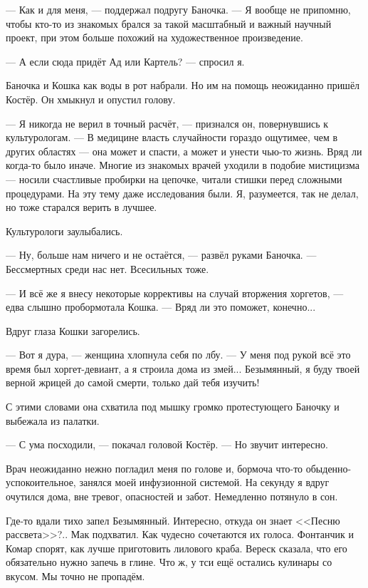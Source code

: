 --- Как и для меня, --- поддержал подругу Баночка.
--- Я вообще не припомню, чтобы кто-то из знакомых брался за такой масштабный и важный научный проект, при этом больше похожий на художественное произведение.

--- А если сюда придёт Ад или Картель? --- спросил я.

Баночка и Кошка как воды в рот набрали.
Но им на помощь неожиданно пришёл Костёр.
Он хмыкнул и опустил голову.

--- Я никогда не верил в точный расчёт, --- признался он, повернувшись к культурологам.
--- В медицине власть случайности гораздо ощутимее, чем в других областях --- она может и спасти, а может и унести чью-то жизнь.
Вряд ли когда-то было иначе.
Многие из знакомых врачей уходили в подобие мистицизма --- носили счастливые пробирки на цепочке, читали стишки перед сложными процедурами.
На эту тему даже исследования были.
Я, разумеется, так не делал, но тоже старался верить в лучшее.

Культурологи заулыбались.

--- Ну, больше нам ничего и не остаётся, --- развёл руками Баночка.
--- Бессмертных среди нас нет.
Всесильных тоже.

--- И всё же я внесу некоторые коррективы на случай вторжения хоргетов, --- едва слышно пробормотала Кошка.
--- Вряд ли это поможет, конечно...

Вдруг глаза Кошки загорелись.

--- Вот я дура, --- женщина хлопнула себя по лбу.
--- У меня под рукой всё это время был хоргет-девиант, а я строила дома из змей\FM...
Безымянный, я буду твоей верной жрицей до самой смерти, только дай тебя изучить!

С этими словами она схватила под мышку громко протестующего Баночку и выбежала из палатки.

--- С ума посходили, --- покачал головой Костёр.
--- Но звучит интересно.

Врач неожиданно нежно погладил меня по голове и, бормоча что-то обыденно-успокоительное, занялся моей инфузионной системой.
На секунду я вдруг очутился дома, вне тревог, опасностей и забот.
Немедленно потянуло в сон.

Где-то вдали тихо запел Безымянный.
Интересно, откуда он знает <<Песню рассвета>>?..
Мак подхватил.
Как чудесно сочетаются их голоса.
Фонтанчик и Комар спорят, как лучше приготовить лилового краба.
Вереск сказала, что его обязательно нужно запечь в глине.
Что ж, у тси ещё остались кулинары со вкусом.
Мы точно не пропадём.

